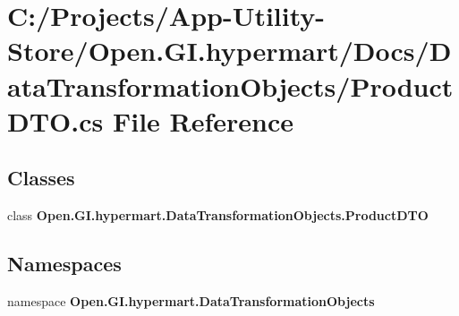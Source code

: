 \section{C\+:/\+Projects/\+App-\/\+Utility-\/\+Store/\+Open.G\+I.\+hypermart/\+Docs/\+Data\+Transformation\+Objects/\+Product\+D\+TO.cs File Reference}
\label{_product_d_t_o_8cs}
\subsection*{Classes}
\begin{DoxyCompactItemize}
\item 
class \textbf{ Open.\+G\+I.\+hypermart.\+Data\+Transformation\+Objects.\+Product\+D\+TO}
\end{DoxyCompactItemize}
\subsection*{Namespaces}
\begin{DoxyCompactItemize}
\item 
namespace \textbf{ Open.\+G\+I.\+hypermart.\+Data\+Transformation\+Objects}
\end{DoxyCompactItemize}
